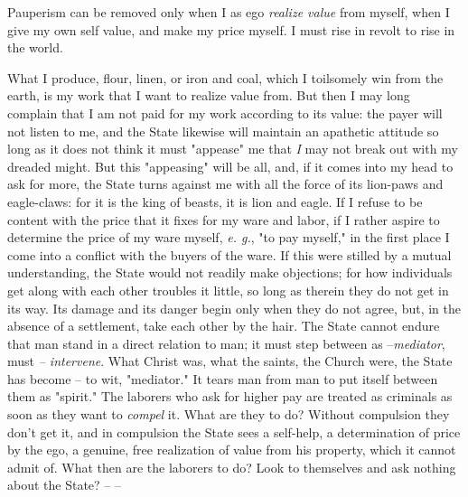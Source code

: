 Pauperism can be removed only when I as ego \textit{realize value} from 
myself, when I give my own self value, and make my price myself. I must rise 
in revolt to rise in the world.

What I produce, flour, linen, or iron and coal, which I toilsomely win from 
the earth, is my work that I want to realize value from. But then I may long 
complain that I am not paid for my work according to its value: the payer will 
not listen to me, and the State likewise will maintain an apathetic attitude 
so long as it does not think it must "{}appease"{} me that \textit{I} may not 
break out with my dreaded might. But this "{}appeasing"{} will be all, and, if 
it comes into my head to ask for more, the State turns against me with all the 
force of its lion-paws and eagle-claws: for it is the king of beasts, it is 
lion and eagle. If I refuse to be content with the price that it fixes for my 
ware and labor, if I rather aspire to determine the price of my ware myself, 
\textit{e. g.}, "{}to pay myself,"{} in the first place I come into a conflict 
with the buyers of the ware. If this were stilled by a mutual understanding, 
the State would not readily make objections; for how individuals get along 
with each other troubles it little, so long as therein they do not get in its 
way. Its damage and its danger begin only when they do not agree, but, in the 
absence of a settlement, take each other by the hair. The State cannot endure 
that man stand in a direct relation to man; it must step between as 
--\textit{mediator}, must \textit{-- intervene}. What Christ was, what the 
saints, the Church were, the State has become -- to wit, "{}mediator."{} It 
tears man from man to put itself between them as "{}spirit."{} The laborers 
who ask for higher pay are treated as criminals as soon as they want to 
\textit{compel} it. What are they to do? Without compulsion they don't get it, 
and in compulsion the State sees a self-help, a determination of price by the 
ego, a genuine, free realization of value from his property, which it cannot 
admit of. What then are the laborers to do? Look to themselves and ask nothing 
about the State? -- --

